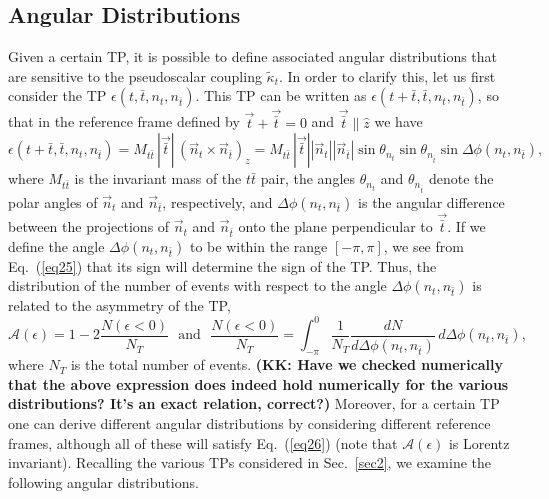 \documentclass[aps,preprint,tightenlines,floatfix,superscriptaddress,nofootinbib,showpacs]{revtex4-1}
\def\beq{\begin{equation}}
\def\eeq{\end{equation}}
\def\tbar{\bar{t}}
\def\kpt{\tilde{\kappa}_t}
\begin{document}
\subsection{Angular Distributions}
\label{sec3.2}

Given a certain TP, it is possible to define associated angular
distributions that are sensitive to the pseudoscalar coupling
$\kpt$. In order to clarify this, let us first consider the TP
$\epsilon(t,\tbar,n_t,n_{\tbar})$. This TP can be written as
$\epsilon(t+\tbar,\tbar,n_t,n_{\tbar})$, so that in the reference frame
defined by $\vec{t}+\vec{\tbar} =0$ and $\vec{\tbar}\parallel \hat{z}$
we have
%
\beq
\label{eq25}
\epsilon(t+\tbar,\tbar,n_t,n_{\tbar})=M_{t\tbar}\,|\vec{\tbar}|\,(\vec{n}_t\times \vec{n}_{\tbar})_z=M_{t\tbar}\,|\vec{\tbar}||\vec{n}_t||\vec{n}_{\tbar}|\sin\theta_{n_t}\sin\theta_{n_{\tbar}}\sin \Delta \phi(n_t,n_{\tbar}),
\eeq
%
where $M_{t\tbar}$ is the invariant mass of the $t\tbar$ pair, the
angles $\theta_{n_t}$ and $\theta_{n_{\tbar}}$ denote the polar angles
of $\vec{n}_t$ and $\vec{n}_{\tbar}$, respectively, and 
$\Delta\phi(n_t,n_{\tbar})$ is the angular difference between the
projections of $\vec{n}_t$ and $\vec{n}_{\tbar}$ onto the plane
perpendicular to $\vec{\bar{t}}$. If we define the angle
$\Delta\phi(n_t,n_{\tbar})$  to be within the
range $[-\pi,\pi]$, we see from Eq.~(\ref{eq25}) that its sign will
determine the sign of the TP. Thus, the distribution of the
number of events with respect to the angle
$\Delta\phi(n_t,n_{\tbar})$ is related to the asymmetry of the TP,
%
\beq
\label{eq26}
\mathcal{A}(\epsilon)=1-2\frac{N(\epsilon < 0)}{N_T}\,\,\mbox{ and }\,\,\frac{N(\epsilon < 0)}{N_T}=\int^0_{-\pi}\frac{1}{N_T}\frac{dN}{d\Delta\phi(n_t,n_{\tbar})}\,d\Delta\phi(n_t,n_{\tbar}),
\eeq  
%
where $N_T$ is the total number of events.
{\bf (KK: Have we checked numerically that the above
  expression does indeed hold numerically for the various
  distributions?  It's an exact relation, correct?)}
Moreover, for a certain TP
one can derive different angular distributions by considering
different reference frames, although all of these will satisfy
Eq.~(\ref{eq26}) (note that $\mathcal{A}(\epsilon)$
is Lorentz invariant). Recalling the various TPs considered
in Sec.~\ref{sec2}, we examine the following angular distributions.
\end{document}
